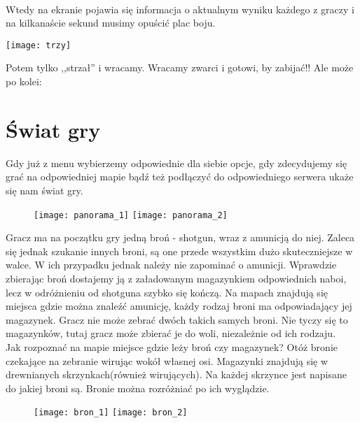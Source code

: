 \documentclass[licencjacka]{pracamgr}
\begin{document}
\ \

Wtedy na ekranie pojawia się informacja o aktualnym wyniku każdego z graczy i na
kilkanaście sekund musimy opuścić plac boju.
\begin{center}
\texttt{[image: trzy]}
\end{center}

Potem tylko ,,strzał'' i wracamy. Wracamy zwarci i gotowi, by
zabijać!! Ale może po kolei:


\section{Świat gry}



Gdy już z menu wybierzemy odpowiednie dla siebie opcje,
gdy zdecydujemy się grać na odpowiedniej mapie bądź też
podłączyć do odpowiedniego serwera ukaże się nam świat gry.

\begin{figure}[htb]
\begin{center}
\texttt{[image: panorama\_1]}
\texttt{[image: panorama\_2]}
\end{center}
\end{figure}

Gracz ma na początku gry jedną broń - shotgun, wraz z amunicją do niej.
Zaleca się jednak szukanie innych broni, są one przede wszystkim dużo
skuteczniejsze w walce. W ich przypadku jednak należy nie zapominać
o amunicji. Wprawdzie zbierając broń dostajemy ją z załadowanym magazynkiem
odpowiednich naboi, lecz w odróżnieniu od shotguna szybko się kończą.
Na mapach znajdują się miejsca gdzie można znaleźć amunicję, każdy rodzaj broni
ma odpowiadający jej magazynek. Gracz nie może zebrać dwóch takich samych
broni. Nie tyczy się to magazynków, tutaj gracz może zbierać je do woli,
niezależnie od ich rodzaju. \\
Jak rozpoznać na mapie miejsce gdzie leży broń czy magazynek? Otóż bronie czekające na
zebranie wirując wokół własnej osi. Magazynki znajdują się w drewnianych skrzynkach(również wirujących).
Na każdej skrzynce jest napisane do jakiej broni są. Bronie można rozróżniać po ich wyglądzie.

\begin{figure}[htb]
\begin{center}
\texttt{[image: bron\_1]}
\texttt{[image: bron\_2]}
\end{center}
\end{figure}
\end{document}

